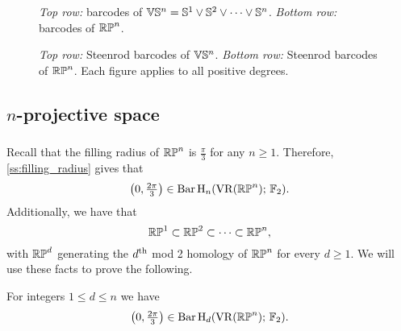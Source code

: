 \begin{figure}
	\centering
	
	\caption{\emph{Top row:} barcodes of $\mathbb{V}\mathbb{S}^n = \mathbb{S}^1 \vee \mathbb{S}^2 \vee \dots \vee \mathbb{S}^n$. \emph{Bottom row:} barcodes of $\mathbb{RP}^n$.}
	\label{fig:barcodes}
\end{figure}

\begin{figure}
	\centering
	
	\caption{\emph{Top row:} Steenrod barcodes of $\mathbb{V}\mathbb{S}^n$. \emph{Bottom row:} Steenrod barcodes of $\mathbb{RP}^n$. Each figure applies to all positive degrees.}
	\label{fig:sq barcodes}
\end{figure}

\subsection{$n$-projective space}

\subsubsection{}\label{prop:RPn bar}

Recall that the filling radius of $\mathbb{RP}^n$ is $\frac{\pi}{3}$ for any $n \geq 1$.
Therefore, \cref{ss:filling_radius} gives that
\[
\left(0, \tfrac{2\pi}{3}\right) \in \operatorname{Bar} \operatorname{H}_{n}(\operatorname{VR}(\mathbb{RP}^n);\,{\mathbb{F}_2}).
\]
Additionally, we have that
\[
\mathbb{RP}^1 \subset \mathbb{RP}^2 \subset \dots \subset \mathbb{RP}^n,
\]
with $\mathbb{RP}^d$ generating the $d^{\mathrm{th}}$ mod 2 homology of $\mathbb{RP}^n$ for every $d \geq 1$.
We will use these facts to prove the following.

\medskip\lemma For integers $1 \leq d \leq n$ we have
\[
\left(0, \tfrac{2\pi}{3}\right) \in \operatorname{Bar} \operatorname{H}_{d}(\operatorname{VR}(\mathbb{RP}^n);\,{\mathbb{F}_2}).
\]

